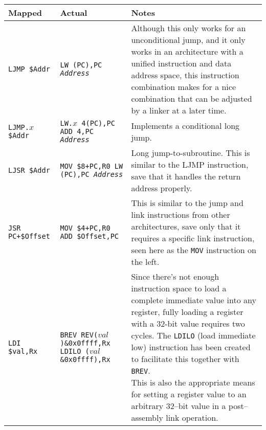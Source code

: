 \documentclass{gqtekspec}
\begin{document}
\begin{table}\begin{center}
\begin{tabular}{p{1.1in}p{1.8in}p{3in}}\\\hline
Mapped & Actual  & Notes \\\hline
{\tt LJMP \$Addr}
	& \parbox[t]{1.5in}{\tt LW (PC),PC \\ {\em Address }}
	& Although this only works for an unconditional jump, and it only
	works in an architecture with a unified instruction and data address
	space, this instruction combination makes for a nice combination that
	can be adjusted by a linker at a later time.\\\hline
{\tt LJMP.$x$ \$Addr}
	& \parbox[t]{1.5in}{\tt LW.$x$ 4(PC),PC \\ ADD 4,PC \\ {\em Address }}
	& Implements a conditional long jump.\\\hline
{\tt LJSR \$Addr  }
	& \parbox[t]{1.5in}{\tt MOV \$8+PC,R0 \\ LW (PC),PC \\ {\em Address}}
	& Long jump-to-subroutine.  This is similar to the LJMP instruction,
	save that it handles the return address properly.
	\\\hline
{\tt JSR PC+\$Offset  }
	& \parbox[t]{1.5in}{\tt MOV \$4+PC,R0 \\ ADD \$Offset,PC}
	& This is similar to the jump and link instructions from other
	architectures, save only that it requires a specific link
	instruction, seen here as the {\tt MOV} instruction on the
	left.\\\hline
{\tt LDI \$val,Rx }
	& \parbox[t]{1.8in}{\tt BREV REV($val$)\&0x0ffff,Rx \\
			LDILO ($val$\&0x0ffff),Rx}
	& \parbox[t]{3.0in}{Since there's not enough instruction
		space to load a complete immediate value into any register,
		fully loading a register with a 32-bit value requires two
		cycles.  The {\tt LDILO} (load immediate low) instruction
		has been created to facilitate this together with {\tt BREV}.
		\\
	This is also the appropriate means for setting a register value
	to an arbitrary 32--bit value in a post--assembly link
	operation.}\\\hline

\end{tabular}
\end{center}
\end{table}
\end{document}
